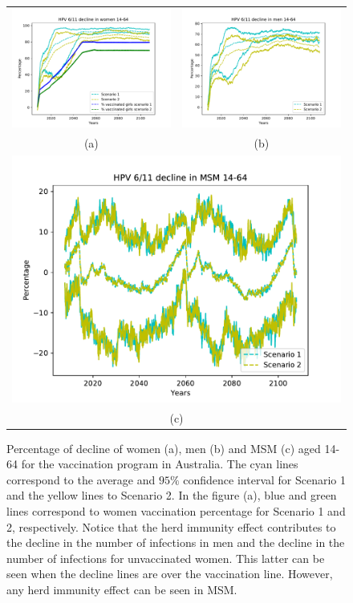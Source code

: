 \begin{figure}[!]
	\centering
	\begin{tabular}{cc}
		\includegraphics[width=0.45\linewidth]{IMGs/3.-Australia/decline_14_64_verr_muj.pdf}	& 
		\includegraphics[width=0.45\linewidth]{IMGs/3.-Australia/decline_14_64_verr_hom.pdf}  \\ 
		(a)	& (b) \\ 
		\multicolumn{2}{c}{ \includegraphics[width=0.5\linewidth]{IMGs/3.-Australia/decline_14_64_verr_MSM.pdf} } \\ 
		\multicolumn{2}{c}{(c)} \\ 
	\end{tabular} 
	\caption{Percentage of decline of women (a), men (b) and MSM (c) aged 14-64 for the vaccination program in Australia. The cyan lines correspond to the average and $95\%$ confidence interval for Scenario 1 and the yellow lines to Scenario 2. In the figure (a), blue and green lines correspond to women vaccination percentage for Scenario 1 and 2, respectively. Notice that the herd immunity effect contributes to the decline in the number of infections in men and the decline in the number of infections for unvaccinated women. This latter can be seen when the decline lines are over the vaccination line. However, any herd immunity effect can be seen in MSM.}
	\label{fig:decline_AUS_6_11_14_64}
\end{figure}

